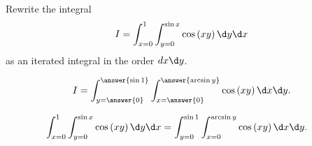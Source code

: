 \documentclass{ximera}
\author{Jim Fowler}
\begin{document}
\begin{exercise}
Rewrite the integral
\[
I = \int_{x = 0}^1 \int_{y = 0}^{\sin x} \cos \left( x y \right) \d y \d x
\]
as an iterated integral in the order $dx \d y$.

\[
  I = \int_{y = \answer{0}}^{\answer{\sin 1}} \int_{x = \answer{0}}^{\answer{\arcsin y}} \cos \left( x y \right) \d x \d y.
\]


\begin{hint}
  \begin{align*}
\int_{x = 0}^1 \int_{y = 0}^{\sin x} \cos \left( x y \right) \d y \d x
&= \int_{y = 0}^{\sin 1} \int_{x = 0}^{\arcsin y} \cos \left( x y \right) \d x \d y.
  \end{align*}
\end{hint}

\end{exercise}
\end{document}
